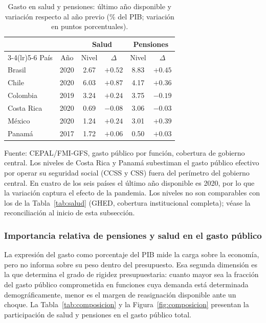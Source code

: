 \documentclass[12pt, letterpaper]{article}
\begin{document}
\begin{table}[htbp]
  \centering
  \caption{Gasto en salud y pensiones: último año disponible y variación respecto al
  año previo (\% del PIB; variación en puntos porcentuales).}
  \label{tab:ultimo-gfs}
  \begin{tabular}{lccccc}
    \toprule
    & & \multicolumn{2}{c}{Salud} & \multicolumn{2}{c}{Pensiones} \\
    \cmidrule(lr){3-4}\cmidrule(lr){5-6}
    País & Año & Nivel & $\Delta$ & Nivel & $\Delta$ \\
    \midrule
    Brasil     & 2020 & 2.67 & $+0.52$ & 8.83 & $+0.45$ \\
    Chile      & 2020 & 6.03 & $+0.87$ & 4.17 & $+0.36$ \\
    Colombia   & 2019 & 3.24 & $+0.24$ & 3.75 & $-0.19$ \\
    Costa Rica & 2020 & 0.69 & $-0.08$ & 3.06 & $-0.03$ \\
    México     & 2020 & 1.24 & $+0.24$ & 3.01 & $+0.39$ \\
    Panamá     & 2017 & 1.72 & $+0.06$ & 0.50 & $+0.03$ \\
    \bottomrule
  \end{tabular}

  \vspace{2pt}
  \footnotesize
  Fuente: CEPAL/FMI-GFS, gasto público por función, cobertura de gobierno central.
  Los niveles de Costa Rica y Panamá subestiman el gasto público efectivo por operar
  su seguridad social (CCSS y CSS) fuera del perímetro del gobierno central. En cuatro
  de los seis países el último año disponible es 2020, por lo que la variación captura
  el efecto de la pandemia. Los niveles no son comparables con los de la
  Tabla~\ref{tab:salud} (GHED, cobertura institucional completa); véase la
  reconciliación al inicio de esta subsección.
\end{table}

\subsubsection{Importancia relativa de pensiones y salud en el gasto público}

La expresión del gasto como porcentaje del PIB mide la carga sobre la economía, pero no informa sobre su peso dentro del presupuesto. Esa segunda dimensión es la que determina el grado de rigidez presupuestaria: cuanto mayor sea la fracción del gasto público
comprometida en funciones cuya demanda está determinada demográficamente, menor es el margen de reasignación disponible ante un choque. La Tabla~\ref{tab:composicion} y la
Figura~\ref{fig:composicion} presentan la participación de salud y pensiones en el gasto
público total.
\end{document}
